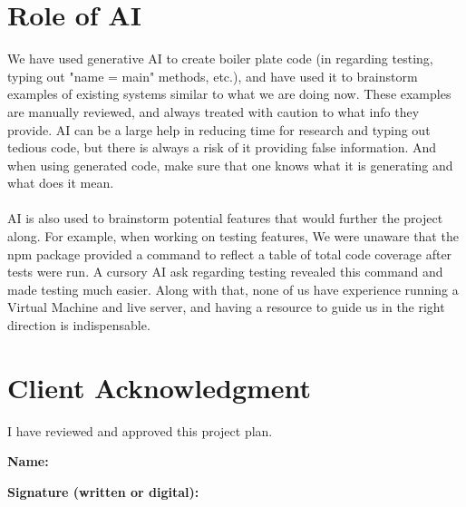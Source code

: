 \documentclass{article}
\begin{document}
\section*{Role of AI}
We have used generative AI to create boiler plate code (in regarding testing, typing out "name = main" methods, etc.), and have used it to brainstorm examples of existing systems similar to what we are doing now. These examples are manually reviewed, and always treated with caution to what info they provide. AI can be a large help in reducing time for research and typing out tedious code, but there is always a risk of it providing false information. And when using generated code, make sure that one knows what it is generating and what does it mean. \\\\ 
AI is also used to brainstorm potential features that would further the project along. For example, when working on testing features, We were unaware that the npm package provided a command to reflect a table of total code coverage after tests were run. A cursory AI ask regarding testing revealed this command and made testing much easier. Along with that, none of us have experience running a Virtual Machine and live server, and having a resource to guide us in the right direction is indispensable.

\section*{Client Acknowledgment}
I have reviewed and approved this project plan.  

\vspace{1em}
\noindent\textbf{Name:} \underline{\hspace{7cm}}  

\vspace{1em}
\noindent\textbf{Signature (written or digital):} \underline{\hspace{7cm}}  
\end{document}
